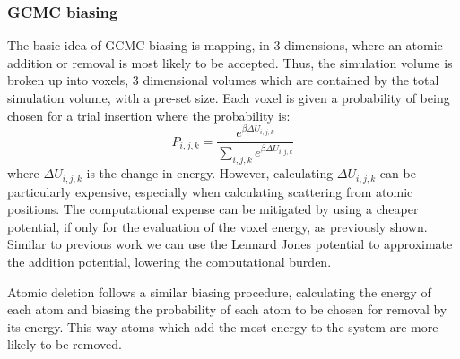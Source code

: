 \subsubsection{GCMC biasing}
The basic idea of GCMC biasing is mapping, in 3 dimensions, where an atomic addition or removal is most likely to be accepted.
Thus, the simulation volume is broken up into voxels, 3 dimensional volumes which are contained by the total simulation volume, with a pre-set size.
Each voxel is given a probability of being chosen for a trial insertion where the probability is:
\begin{equation}
  P_{i, j, k} = \frac{e^{\beta \Delta U_{i, j, k}}}{\sum_{i, j, k}e^{\beta \Delta U_{i, j, k}}}
\end{equation}
where $\Delta U_{i, j, k}$ is the change in energy.
However, calculating $\Delta U_{i, j, k}$ can be particularly expensive, especially when calculating scattering from atomic positions.
The computational expense can be mitigated by using a cheaper potential, if only for the evaluation of the voxel energy, as previously shown.
Similar to previous work we can use the Lennard Jones potential to approximate the addition potential, lowering the computational burden. \cite{Snurr1993}

Atomic deletion follows a similar biasing procedure, calculating the energy of each atom and biasing the probability of each atom to be chosen for removal by its energy.
This way atoms which add the most energy to the system are more likely to be removed.

